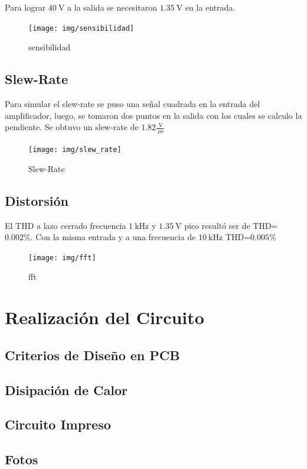 \documentclass[a4paper,12pt,twoside]{article}
\newcommand{\volt}{\ensuremath{~\mathrm{V}}}
\newcommand{\kHz}{\ensuremath{~\mathrm{kHz}}}
\newcommand{\uS}{\ensuremath{~\mu\mathrm{s}}}
\begin{document}
Para lograr $40 \volt$ a la salida se necesitaron $1.35 \volt$ en la entrada.

\begin{figure}[H]
\centering
\texttt{[image: img/sensibilidad]}
\caption{sensibilidad}
\label{sens} 
\end{figure}


\subsection{Slew-Rate}

Para simular el slew-rate se puso una señal cuadrada en la entrada del amplificador, luego, se tomaron dos puntos en la salida con los cuales se calculo la pendiente.
Se obtuvo un slew-rate de $1.82 \frac{\volt}{\uS}$

\begin{figure}[H]
\centering
\texttt{[image: img/slew\_rate]}
\caption{Slew-Rate}
\label{slew} 
\end{figure}



\subsection{Distorsión}

El THD a lazo cerrado frecuencia $1 \kHz$ y $1.35 \volt$ pico resultó ser de  THD=$0.002\%$.
Con la misma entrada y a una frecuencia de $10 \kHz$ THD=$0.005\%$


\begin{figure}[H]
\centering
\texttt{[image: img/fft]}
\caption{fft}
\label{fft} 
\end{figure}



\newpage
\section{Realización del Circuito}
\subsection{Criterios de Diseño en PCB}
\subsection{Disipación de Calor}
\subsection{Circuito Impreso }
\subsection{Fotos}
\end{document}
